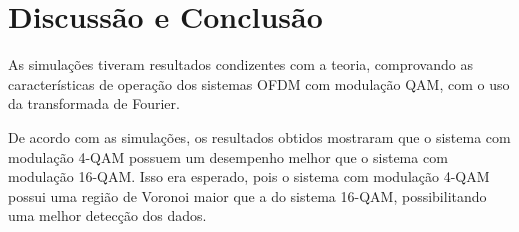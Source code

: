 \newpage
\section{Discussão e Conclusão}
As simulações tiveram resultados condizentes com a teoria, comprovando as características de operação dos sistemas OFDM com modulação QAM, com o uso da transformada de Fourier. 

De acordo com as simulações, os resultados obtidos mostraram que o sistema com 
modulação 4-QAM possuem um desempenho melhor que o sistema com modulação 16-QAM. Isso era esperado, pois o sistema com modulação 4-QAM possui uma região de Voronoi maior que a do sistema 16-QAM, possibilitando uma melhor detecção dos dados.